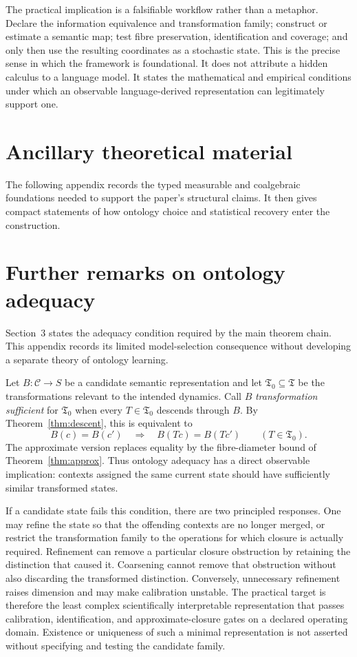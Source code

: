 \documentclass[11pt]{article}
\newcommand{\Ctxt}{\mathcal C}
\newcommand{\Trans}{\mathfrak T}
\begin{document}
The practical implication is a falsifiable workflow rather than a metaphor.
Declare the information equivalence and transformation family; construct or
estimate a semantic map; test fibre preservation, identification and
coverage; and only then use the resulting coordinates as a stochastic state.
This is the precise sense in which the framework is foundational.  It does
not attribute a hidden calculus to a language model.  It states the
mathematical and empirical conditions under which an observable
language-derived representation can legitimately support one.

\clearpage
\appendix
\section*{Ancillary theoretical material}
The following appendix records the typed measurable and coalgebraic
foundations needed to support the paper's structural claims.  It then gives
compact statements of how ontology choice and statistical recovery enter the
construction.

\appendixcategorical

\section{Further remarks on ontology adequacy}

Section~3 states the adequacy condition required by the main theorem chain.
This appendix records its limited model-selection consequence without
developing a separate theory of ontology learning.

Let $B:\Ctxt\to S$ be a candidate semantic representation and let
$\Trans_0\subseteq\Trans$ be the transformations relevant to the intended
dynamics.  Call $B$ \emph{transformation sufficient} for $\Trans_0$ when every
$T\in\Trans_0$ descends through $B$.  By Theorem~\ref{thm:descent}, this is
equivalent to
\[
 B(c)=B(c')
 \quad\Longrightarrow\quad
 B(Tc)=B(Tc')
 \qquad(T\in\Trans_0).
\]
The approximate version replaces equality by the fibre-diameter bound of
Theorem~\ref{thm:approx}.  Thus ontology adequacy has a direct observable
implication: contexts assigned the same current state should have sufficiently
similar transformed states.

If a candidate state fails this condition, there are two principled
responses.  One may refine the state so that the offending contexts are no
longer merged, or restrict the transformation family to the operations for
which closure is actually required.  Refinement can remove a particular
closure obstruction by retaining the distinction that caused it.  Coarsening
cannot remove that obstruction without also discarding the transformed
distinction.  Conversely, unnecessary refinement raises dimension and may
make calibration unstable.  The practical target is therefore the least
complex scientifically interpretable representation that passes calibration,
identification, and approximate-closure gates on a declared operating domain.
Existence or uniqueness of such a minimal representation is not asserted
without specifying and testing the candidate family.
\end{document}
